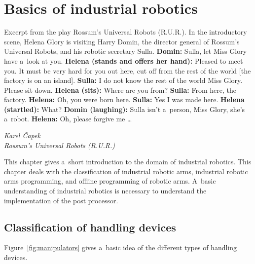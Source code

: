 ﻿\chapter{Basics of industrial robotics \label{chap:basics}}

\epigraph{

Excerpt from the play Rossum’s Universal Robots (R.U.R.).\break
In the introductory scene, Helena Glory is visiting Harry Domin, the director general of Rossum’s Universal Robots, and his robotic secretary Sulla.\break
\break
\textbf{Domin:} Sulla, let Miss Glory have a~look at you.\break
\textbf{Helena (stands and offers her hand):} Pleased to meet you. It must be very hard for you out here, cut off from the rest of the world [the factory is on an island].\break
\textbf{Sulla:} I do not know the rest of the world Miss Glory. Please sit down.\break
\textbf{Helena (sits):} Where are you from?\break
\textbf{Sulla:} From here, the factory.\break
\textbf{Helena:} Oh, you were born here.\break
\textbf{Sulla:} Yes I was made here.\break
\textbf{Helena (startled):} What?\break
\textbf{Domin (laughing):} Sulla isn’t a~person, Miss Glory, she’s a~robot.\break
\textbf{Helena:} Oh, please forgive me …
}{\textit{Karel Čapek \\ Rossum’s Universal Robots (R.U.R.)}}

This chapter gives a~short introduction to the domain of industrial robotics. This chapter deals with the classification of industrial robotic arms, industrial robotic arms programming, and offline programming of robotic arms. A~basic understanding of industrial robotics is necessary to understand the implementation of the post processor. 

\section{Classification of handling devices}

Figure~\ref{fig:manipulators} gives a~basic idea of the different types of handling devices. 


